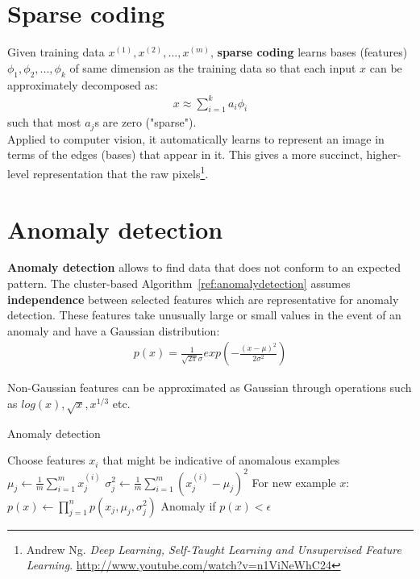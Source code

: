 \documentclass{report}
\begin{document}
\section{Sparse coding}
\label{chapter:sparsecoding}
Given training data $x^{(1)},x^{(2)},...,x^{(m)}$, {\bf sparse coding} learns bases (features) $\phi_1, \phi_2, ..., \phi_k$ of same dimension as the training data so that each input $x$ can be approximately decomposed as:
\begin{align*}
x \approx \sum_{i=1}^k a_i \phi_i
\end{align*}
such that most $a_j$s are zero ("sparse"). \\
Applied to computer vision, it automatically learns to represent an image in terms of the edges (bases) that appear in it.
This gives a more succinct, higher-level representation that the raw pixels\footnote{Andrew Ng. {\em Deep Learning, Self-Taught Learning and Unsupervised Feature Learning}. \url{http://www.youtube.com/watch?v=n1ViNeWhC24}}.


\section{Anomaly detection}
{\bf Anomaly detection} allows to find data that does not conform to an expected pattern. The cluster-based Algorithm~\ref{ref:anomalydetection} assumes {\bf independence} between selected features which are representative for anomaly detection. These features take unusually large or small values in the event of an anomaly and have a Gaussian distribution:
\begin{align*}
p(x)=\frac{1}{\sqrt{2\pi}\sigma}exp(-\frac{(x-\mu)^2}{2\sigma^2})
\end{align*}

Non-Gaussian features can be approximated as Gaussian through operations such as $log(x), \sqrt{x}, x^{1/3}$ etc.

\begin{algorithm}
\caption{Anomaly detection}
\label{ref:anomalydetection}
\begin{algorithmic}
\State Choose features $x_i$ that might be indicative of anomalous examples
\State $\mu_j \gets \frac{1}{m}\sum_{i=1}^{m}x_j^{(i)}$ 
\State $\sigma_j^2 \gets \frac{1}{m}\sum_{i=1}^{m}(x_j^{(i)}-\mu_j)^2$
\State For new example $x$: $p(x) \gets \prod_{j=1}^np(x_j,\mu_j,\sigma_j^2)$ 
\State Anomaly if $p(x) < \epsilon$
\end{algorithmic}
\end{algorithm}
\end{document}
